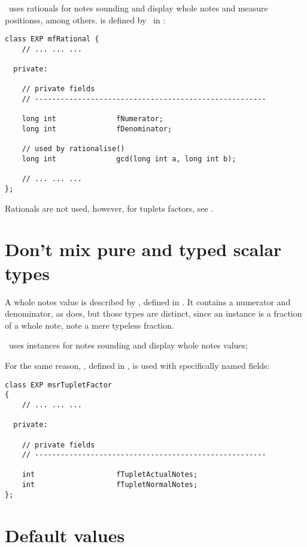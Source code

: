 \mf\ uses rationals for notes sounding and display whole notes and measure positionss, among others.
 is defined by \libmusicxml\ in :
\begin{lstlisting}[language=CPlusPlus]
class EXP mfRational {
	// ... ... ...
	
  private:

    // private fields
    // ------------------------------------------------------

    long int              fNumerator;
    long int              fDenominator;

    // used by rationalise()
    long int              gcd(long int a, long int b);

	// ... ... ...
};
\end{lstlisting}

Rationals are not used, however, for tuplets factors, see .


\section{Don't mix pure and typed scalar types}

A whole notes value is described by , defined in . It contains a numerator and denominator, as  does, but those types are distinct, since an  instance is a fraction of a whole note, note a mere typeless fraction.

\mf\ uses  instances for notes sounding and display whole notes values;

For the same reason, , defined in , is used with specifically named fields:
\begin{lstlisting}[language=CPlusPlus]
class EXP msrTupletFactor
{
	// ... ... ...
	
  private:

    // private fields
    // ------------------------------------------------------

    int                   fTupletActualNotes;
    int                   fTupletNormalNotes;
};
\end{lstlisting}


\section{Default values}

